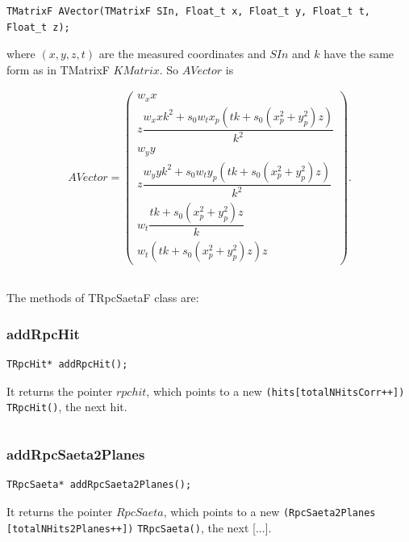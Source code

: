 \documentclass[a4paper]{book}
\begin{document}
\begin{itemize}
	\begin{lstlisting}[style=customc]
TMatrixF AVector(TMatrixF SIn, Float_t x, Float_t y, Float_t t, Float_t z);
	\end{lstlisting}
	
	where $(x, y, z, t)$ are the measured coordinates and $SIn$ and $k$ have the same form as in TMatrixF $KMatrix$. So $AVector$ is
	
	\begin{align*}
	AVector = \left(
	\begin{array}{c}
	w_x x\\
	z \dfrac{w_x x k^2 + s_0 w_t x_p (t k+ s_0 (x_p^2 +y_p^2 )z)}{k^2}\\
	w_y y\\
	z \dfrac{w_y y k^2 + s_0 w_t y_p (t k+ s_0 (x_p^2 +y_p^2 )z)}{k^2}\\
	w_t \dfrac{t k + s_0 (x_p^2+ y_p^2)z}{k}\\
	w_t (t k + s_0 (x_p^2+ y_p^2)z) z
	\end{array} \right).
	\end{align*}
	
	
\end{itemize}

\[\]

The methods of TRpcSaetaF class are:

\subsubsection{addRpcHit}

\begin{lstlisting}[style=customc]
TRpcHit* addRpcHit();
\end{lstlisting}

It returns the pointer $rpchit$, which points to a new \texttt{(hits[totalNHitsCorr++]) TRpcHit()}, the next hit.

\[\]

\subsubsection{addRpcSaeta2Planes}

\begin{lstlisting}[style=customc]
TRpcSaeta* addRpcSaeta2Planes();
\end{lstlisting}

It returns the pointer $RpcSaeta$, which points to a new \texttt{(RpcSaeta2Planes} \texttt{[totalNHits2Planes++])} \texttt{TRpcSaeta()}, the next [...].
\end{document}
